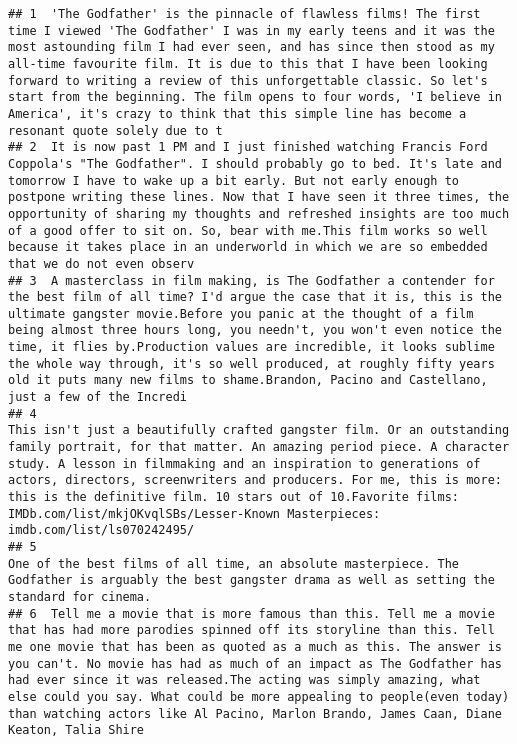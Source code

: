 \documentclass[
]{article}
\begin{document}
\begin{verbatim}
## 1  'The Godfather' is the pinnacle of flawless films! The first time I viewed 'The Godfather' I was in my early teens and it was the most astounding film I had ever seen, and has since then stood as my all-time favourite film. It is due to this that I have been looking forward to writing a review of this unforgettable classic. So let's start from the beginning. The film opens to four words, 'I believe in America', it's crazy to think that this simple line has become a resonant quote solely due to t
## 2  It is now past 1 PM and I just finished watching Francis Ford Coppola's "The Godfather". I should probably go to bed. It's late and tomorrow I have to wake up a bit early. But not early enough to postpone writing these lines. Now that I have seen it three times, the opportunity of sharing my thoughts and refreshed insights are too much of a good offer to sit on. So, bear with me.This film works so well because it takes place in an underworld in which we are so embedded that we do not even observ
## 3  A masterclass in film making, is The Godfather a contender for the best film of all time? I'd argue the case that it is, this is the ultimate gangster movie.Before you panic at the thought of a film being almost three hours long, you needn't, you won't even notice the time, it flies by.Production values are incredible, it looks sublime the whole way through, it's so well produced, at roughly fifty years old it puts many new films to shame.Brandon, Pacino and Castellano, just a few of the Incredi
## 4                                                                                This isn't just a beautifully crafted gangster film. Or an outstanding family portrait, for that matter. An amazing period piece. A character study. A lesson in filmmaking and an inspiration to generations of actors, directors, screenwriters and producers. For me, this is more: this is the definitive film. 10 stars out of 10.Favorite films: IMDb.com/list/mkjOKvqlSBs/Lesser-Known Masterpieces: imdb.com/list/ls070242495/
## 5                                                                                                                                                                                                                                                                                                                                                             One of the best films of all time, an absolute masterpiece. The Godfather is arguably the best gangster drama as well as setting the standard for cinema.
## 6  Tell me a movie that is more famous than this. Tell me a movie that has had more parodies spinned off its storyline than this. Tell me one movie that has been as quoted as a much as this. The answer is you can't. No movie has had as much of an impact as The Godfather has had ever since it was released.The acting was simply amazing, what else could you say. What could be more appealing to people(even today) than watching actors like Al Pacino, Marlon Brando, James Caan, Diane Keaton, Talia Shire 

\end{verbatim}
\end{document}
